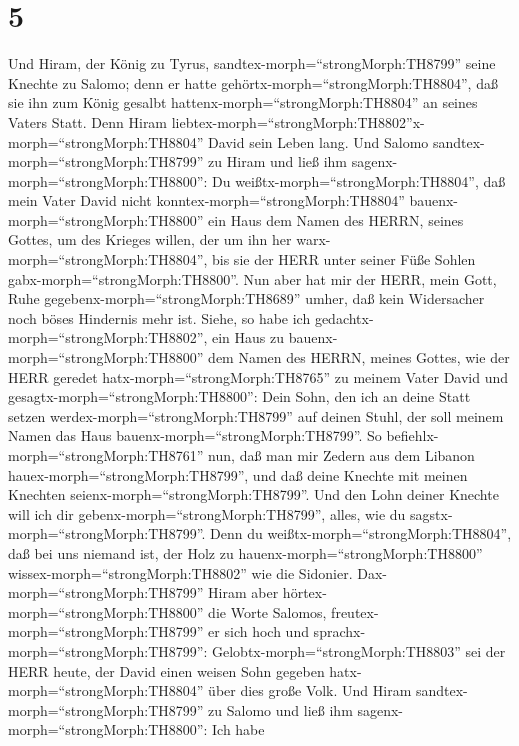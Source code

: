 \hypertarget{section-4}{%
\section{5}\label{section-4}}

 Und Hiram, der König zu Tyrus,
sandtex-morph=``strongMorph:TH8799'' seine Knechte zu Salomo; denn er
hatte gehörtx-morph=``strongMorph:TH8804'', daß sie ihn zum König
gesalbt hattenx-morph=``strongMorph:TH8804'' an seines Vaters Statt.
Denn Hiram
liebtex-morph=``strongMorph:TH8802''x-morph=``strongMorph:TH8804'' David
sein Leben lang.  Und Salomo
sandtex-morph=``strongMorph:TH8799'' zu Hiram und ließ ihm
sagenx-morph=``strongMorph:TH8800'':  Du
weißtx-morph=``strongMorph:TH8804'', daß mein Vater David nicht
konntex-morph=``strongMorph:TH8804'' bauenx-morph=``strongMorph:TH8800''
ein Haus dem Namen des HERRN, seines Gottes, um des Krieges willen, der
um ihn her warx-morph=``strongMorph:TH8804'', bis sie der HERR unter
seiner Füße Sohlen gabx-morph=``strongMorph:TH8800''.  Nun
aber hat mir der HERR, mein Gott, Ruhe
gegebenx-morph=``strongMorph:TH8689'' umher, daß kein Widersacher noch
böses Hindernis mehr ist.  Siehe, so habe ich
gedachtx-morph=``strongMorph:TH8802'', ein Haus zu
bauenx-morph=``strongMorph:TH8800'' dem Namen des HERRN, meines Gottes,
wie der HERR geredet hatx-morph=``strongMorph:TH8765'' zu meinem Vater
David und gesagtx-morph=``strongMorph:TH8800'': Dein Sohn, den ich an
deine Statt setzen werdex-morph=``strongMorph:TH8799'' auf deinen Stuhl,
der soll meinem Namen das Haus bauenx-morph=``strongMorph:TH8799''.
 So befiehlx-morph=``strongMorph:TH8761'' nun, daß man mir
Zedern aus dem Libanon hauex-morph=``strongMorph:TH8799'', und daß deine
Knechte mit meinen Knechten seienx-morph=``strongMorph:TH8799''. Und den
Lohn deiner Knechte will ich dir gebenx-morph=``strongMorph:TH8799'',
alles, wie du sagstx-morph=``strongMorph:TH8799''. Denn du
weißtx-morph=``strongMorph:TH8804'', daß bei uns niemand ist, der Holz
zu hauenx-morph=``strongMorph:TH8800''
wissex-morph=``strongMorph:TH8802'' wie die Sidonier. 
Dax-morph=``strongMorph:TH8799'' Hiram aber
hörtex-morph=``strongMorph:TH8800'' die Worte Salomos,
freutex-morph=``strongMorph:TH8799'' er sich hoch und
sprachx-morph=``strongMorph:TH8799'':
Gelobtx-morph=``strongMorph:TH8803'' sei der HERR heute, der David einen
weisen Sohn gegeben hatx-morph=``strongMorph:TH8804'' über dies große
Volk.  Und Hiram sandtex-morph=``strongMorph:TH8799'' zu
Salomo und ließ ihm sagenx-morph=``strongMorph:TH8800'': Ich habe
